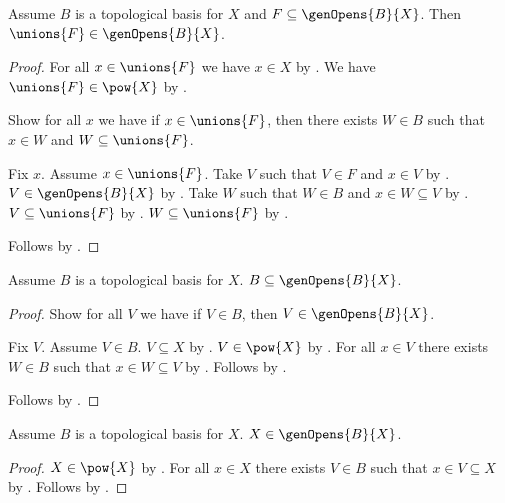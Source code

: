 \begin{lemma}\label{union_in_genopens}
    Assume $B$ is a topological basis for $X$ and
        $F\subseteq \genOpens{B}{X}$.
    Then $\unions{F}\in\genOpens{B}{X}$.
\end{lemma}
\begin{proof}
    For all $x\in\unions{F}$ we have $x\in X$
        by .
    We have $\unions{F}\in\pow{X}$ by .

    Show for all $x$ we have if $x\in\unions{F}$, then
    there exists $W\in B$ such that $x\in W$ and
    $W\subseteq\unions{F}$.
    \begin{subproof}
        Fix $x$.
        Assume $x\in\unions{F}$.
        Take $V$ such that $V\in F$ and $x\in V$ by .
        $V\in\genOpens{B}{X}$ by .
        Take $W$ such that $W\in B$ and $x\in W\subseteq V$
            by .
        $V\subseteq\unions{F}$ by .
        $W\subseteq\unions{F}$ by .
    \end{subproof}
    Follows by .
\end{proof}

\begin{lemma}\label{basis_is_in_genopens}
    Assume $B$ is a topological basis for $X$.
    $B \subseteq \genOpens{B}{X}$.
\end{lemma}
\begin{proof}
    Show for all $V$ we have if $V\in B$, then
    $V\in\genOpens{B}{X}$.
    \begin{subproof}
        Fix $V$.
        Assume $V\in B$.
        $V\subseteq X$
            by .
        $V\in\pow{X}$ by .
        For all $x\in V$ there exists $W\in B$
            such that $x\in W\subseteq V$ by .
        Follows by .
    \end{subproof}
    Follows by .
\end{proof}

\begin{lemma}\label{all_is_in_genopens}
    Assume $B$ is a topological basis for $X$.
    $X \in \genOpens{B}{X}$.
\end{lemma}
\begin{proof}
    $X\in\pow{X}$ by .
    For all $x\in X$ there exists $V\in B$ such that $x\in V\subseteq X$
        by .
    Follows by .
\end{proof}

